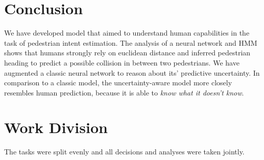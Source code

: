 
\section{Conclusion} \label{sec:conclusion}
We have developed model that aimed to understand human capabilities in the task of pedestrian intent estimation. The analysis of a neural network and HMM shows that humans strongly rely on euclidean distance and inferred pedestrian heading to predict a possible collision in between two pedestrians. We have augmented a classic neural network to reason about its' predictive uncertainty. In comparison to a classic model, the uncertainty-aware model more closely resembles human prediction, because it is able to \textit{know what it doesn't know}.

\section{Work Division} \label{sec:work-division}
The tasks were split evenly and all decisions and analyses were taken jointly. 
